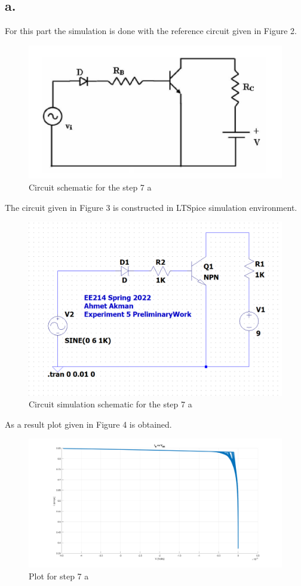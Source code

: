 \documentclass[letterpaper,12pt]{article}
\begin{document}
\subsection{a.}
For this part the simulation is done with the reference circuit given in Figure 2.
\begin{figure}[H]
    \centering
    \includegraphics[width=1\textwidth]{fig1.png}
    \caption{Circuit schematic for the step 7 a}
    \end{figure} 
    The circuit given in Figure 3 is constructed in LTSpice simulation environment.
\begin{figure}[H]
\centering
\includegraphics[width=1\textwidth]{1sim.png}
\caption{Circuit simulation schematic for the step 7 a}
\end{figure} 
As a result plot given in Figure 4 is obtained.
\begin{figure}[H]
    \centering
    \includegraphics[width=1\textwidth]{7_1.png}
    \caption{Plot for step 7 a}
    \end{figure} 
    
\end{document}
